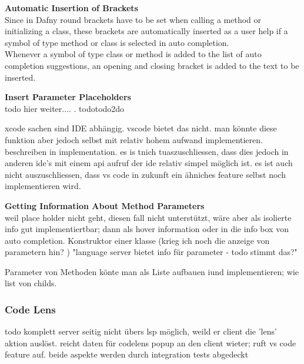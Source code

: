 
\textbf{Automatic Insertion of Brackets}\\
Since in Dafny round brackets have to be set when calling a method or initializing a class,
these brackets are automatically inserted as a user help
if a symbol of type method or class is selected in auto completion. \\

Whenever a symbol of type class or method is added to the list of auto completion suggestions,
an opening and closing bracket is added to the text to be inserted.


\textbf{Insert Parameter Placeholders}\\
todo hier weiter.... . todotodo2do

xcode sachen sind IDE abhängig. vscode bietet das nicht. man könnte diese funktion aber jedoch selbst
mit relativ hohem aufwand implementieren. beschreiben in implementation.
es is tnich tuaszuschliessen, dass dies jedoch in anderen ide's mit einem api aufruf der ide relativ simpel möglich ist.
es ist auch nicht auszuschliessen, dass vs code in zukunft ein ähniches feature selbst noch implementieren wird.


 \textbf{Getting Information About Method Parameters}\\

 weil place holder nicht geht, diesen fall nicht unterstützt, wäre aber
 als isolierte info gut implementiertbar; dann als hover information oder in die info box von auto completion.
 Konstruktor einer klasse
 (krieg ich noch die anzeige von parametern hin? )
 "language server bietet info für parameter - todo stimmt das?"

 Parameter von Methoden könte man als Liste aufbauen iund implementieren;
 wie list von childs.

\subsubsection{Code Lens}
todo
komplett server seitig nicht übers lsp möglich, weild er client die 'lens' aktion auslöst.
reicht daten für codelens popup an den client wieter; ruft vs code feature auf.
beide aspekte werden durch integration tests abgedeckt

